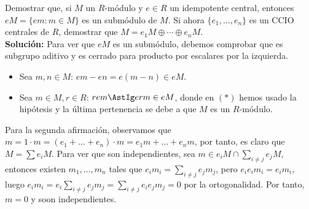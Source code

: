 \begin{ejercicio}\label{ej33}
    Demostrar que, si $M$ un $R$-módulo y $e\in R$ un idempotente central, entonces $eM = \{em : m\in M\}$ es un submódulo de $M$. Si ahora $\{e_1,\ldots,e_n\}$ es un CCIO centrales de $R$, demostrar que $M = e_1M \oplus \cdots \oplus e_nM$. \\
    
    \noindent
    \textbf{Solución:}
    Para ver que $eM$ es un submódulo, debemos comprobar que es subgrupo aditivo y es cerrado para producto por escalares por la izquierda.
    \begin{itemize}
        \item Sea $m, n \in M$: $em - en = e(m-n) \in eM$.
        \item Sea $m\in M, r \in R$: $rem \AstIg erm \in eM$, donde en $(\ast)$ hemos usado la hipótesis y la última pertenencia se debe a que $M$ es un $R$-módulo.
    \end{itemize}

    Para la segunda afirmación, observamos que $m=1\cdot m = (e_1 + \ldots + e_n)\cdot m = e_1m+\ldots+e_nm$, por tanto, es claro que $M = \sum e_iM$. Para ver que son independientes, sea $m \in e_iM \cap \sum\limits_{i\neq j} e_jM$, entonces existen $m_1,\ldots,m_n$ tales que $e_im_i = \sum\limits_{i\neq j} e_jm_j$, pero $e_ie_im_i = e_im_i$, luego $e_im_i = e_i\sum\limits_{i\neq j} e_jm_j = \sum\limits_{i\neq j} e_ie_jm_j = 0$ por la ortogonalidad. Por tanto, $m=0$ y soon independientes. 
\end{ejercicio}

